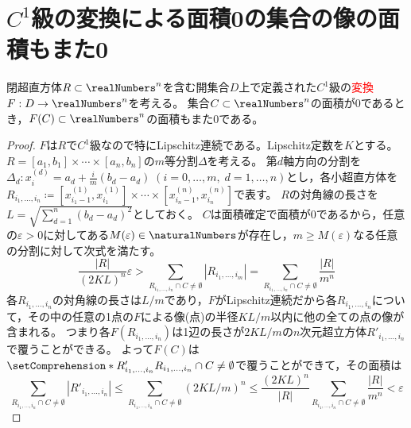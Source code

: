     \section{\texorpdfstring{$C^1$}{C\string^1}級の変換による面積0の集合の像の面積もまた0}
        \begin{shadebox}
            閉超直方体$R\subset\realNumbers^n$を含む開集合$D$上で定義された$C^1$級の\textcolor{red}{変換}$F:D\to\realNumbers^n$を考える。
            集合$C\subset\realNumbers^n$の面積が0であるとき，$F(C)\subset\realNumbers^n$の面積もまた0である。
        \end{shadebox}
        \begin{proof}
            \quad\par
            $F$は$R$で$C^1$級なので特にLipschitz連続である。Lipschitz定数を$K$とする。
            $R = [a_1,b_1]\times\dotsb\times[a_n,b_n]$の$m$等分割$\Delta$を考える。
            第$d$軸方向の分割を$\Delta_d : x^{(d)}_i = a_d + \frac{i}{m}(b_d-a_d)\;(i=0,\dotsc,m,\;d=1,\dotsc,n)$とし，各小超直方体を$R_{i_1,\dotsc,i_n} \coloneq [x^{(1)}_{i_1-1}, x^{(1)}_{i_1}]\times\dotsb\times[x^{(n)}_{i_n-1}, x^{(n)}_{i_n}]$で表す。
            $R$の対角線の長さを$L = \sqrt{\sum_{d=1}^n (b_d-a_d)^2}$としておく。
            $C$は面積確定で面積が0であるから，任意の$\varepsilon>0$に対してある$M(\varepsilon)\in\naturalNumbers$が存在し，$m\geq M(\varepsilon)$なる任意の分割に対して次式を満たす。
            \[ \frac{|R|}{(2KL)^n}\varepsilon > \sum_{R_{i_1,\dotsc,i_n}\cap C\neq \emptyset} |R_{i_1,\dotsc,i_m}| = \sum_{R_{i_1,\dotsc,i_n}\cap C\neq \emptyset}\frac{|R|}{m^n} \]
            各$R_{i_1,\dotsc,i_n}$の対角線の長さは$L/m$であり，$F$がLipschitz連続だから各$R_{i_1,\dotsc,i_n}$について，その中の任意の1点の$F$による像(点)の半径$KL/m$以内に他の全ての点の像が含まれる。
            つまり各$F(R_{i_1,\dotsc,i_n})$は1辺の長さが$2KL/m$の$n$次元超立方体$R'_{i_1,\dotsc,i_n}$で覆うことができる。
            よって$F(C)$は$\setComprehension*{R'_{i_1,\dotsc,i_n}}{R_{i_1,\dotsc,i_n}\cap C\neq\emptyset}$で覆うことができて，その面積は
            \[ \sum_{R_{i_1,\dotsc,i_n}\cap C\neq\emptyset} |R'_{i_1,\dotsc,i_n}| \leq \sum_{R_{i_1,\dotsc,i_n}\cap C\neq\emptyset} \left(2KL/m\right)^n \leq \frac{(2KL)^n}{|R|}\sum_{R_{i_1,\dotsc,i_n}\cap C\neq\emptyset} \frac{|R|}{m^n} < \varepsilon\]
        \end{proof}
